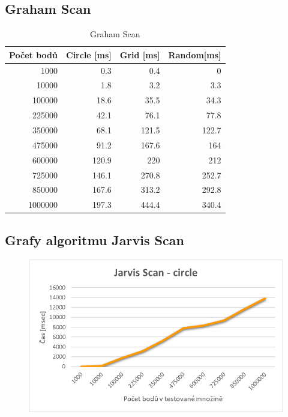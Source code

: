 \documentclass[a4paper, 12pt]{article}
\begin{document}
\subsection{Graham Scan}


\begin{table}[h!]
	\centering
	\begin{tabular}{|r|r|r|r|}
	\hline
	 \textbf{Počet bodů} 	& \textbf{Circle [ms]} & \textbf{Grid [ms]}  & \textbf{Random[ms]} \\ \hline
	 1000 & 0.3 & 0.4 & 0   \\ \hline
	10000 & 1.8 & 3.2 & 3.3   \\ \hline
	100000 & 18.6 & 35.5 & 34.3  \\ \hline
	225000 & 42.1 & 76.1 & 77.8   \\ \hline
	350000 & 68.1 & 121.5 & 122.7  \\ \hline
	475000 & 91.2 & 167.6 & 164 \\ \hline
	600000 & 120.9 & 220 & 212   \\ \hline
	725000 & 146.1 & 270.8 & 252.7  \\ \hline
	850000 & 167.6 & 313.2 & 292.8  \\ \hline
	1000000 & 197.3 & 444.4 & 340.4  \\ \hline
	
	\end{tabular}
		\caption{Graham Scan}
\end{table}

\clearpage
\subsection{Grafy algoritmu Jarvis Scan}
\begin{figure}[h!]
	\centering
	\includegraphics[width=15cm]{grafy/js_circle.png}
\end{figure}
\end{document}
